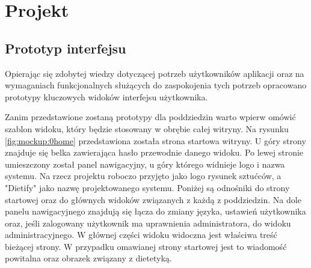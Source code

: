 \chapter{Projekt}\label{ch:project}

%
%
%
%
%
%

\section{Prototyp interfejsu}\label{sec:mockups}

Opierając się zdobytej wiedzy dotyczącej potrzeb użytkowników aplikacji
oraz na wymaganiach funkcjonalnych służących do zaspokojenia tych potrzeb
opracowano prototypy kluczowych widoków interfejsu użytkownika.
\par
Zanim przedstawione zostaną prototypy dla poddziedzin warto wpierw omówić szablon widoku, który będzie stosowany w obrębie całej witryny.
Na rysunku \ref{fig:mockup:0home} przedstawiona została strona startowa witryny.
U góry strony znajduje się belka zawierająca hasło przewodnie danego widoku.
Po lewej stronie umieszczony został panel nawigacyjny, u góry którego widnieje logo i nazwa systemu.
Na rzecz projektu roboczo przyjęto jako logo rysunek sztućców, a "Dietify" jako nazwę projektowanego systemu.
Poniżej są odnośniki do strony startowej oraz do głównych widoków związanych z każdą z poddziedzin.
Na dole panelu nawigacyjnego znajdują się łącza do zmiany języka, ustawień użytkownika oraz, jeśli zalogowany użytkownik ma uprawnienia administratora, do widoku administracyjnego.
W głównej części widoku widoczna jest właściwa treść bieżącej strony.
W przypadku omawianej strony startowej jest to wiadomość powitalna oraz obrazek związany z dietetyką.

